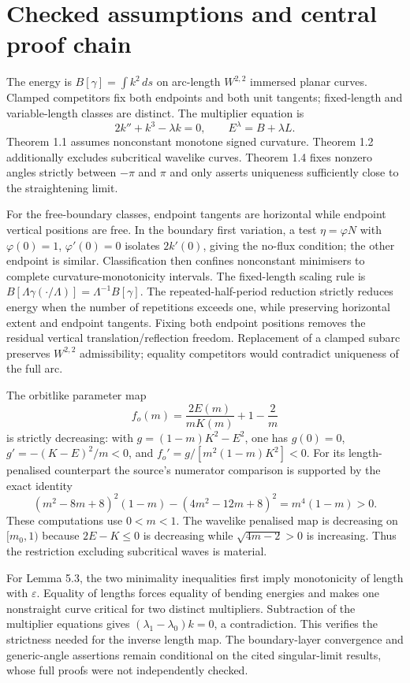 \documentclass[10pt]{article}
\begin{document}
\section*{Checked assumptions and central proof chain}
The energy is \(B[\gamma]=\int k^2\,ds\) on arc-length \(W^{2,2}\) immersed planar curves. Clamped competitors fix both endpoints and both unit tangents; fixed-length and variable-length classes are distinct. The multiplier equation is \[2k''+k^3-\lambda k=0,\qquad E^\lambda=B+\lambda L.\] Theorem 1.1 assumes nonconstant monotone signed curvature. Theorem 1.2 additionally excludes subcritical wavelike curves. Theorem 1.4 fixes nonzero angles strictly between \(-\pi\) and \(\pi\) and only asserts uniqueness sufficiently close to the straightening limit.\par
For the free-boundary classes, endpoint tangents are horizontal while endpoint vertical positions are free. In the boundary first variation, a test \(\eta=\varphi N\) with \(\varphi(0)=1\), \(\varphi'(0)=0\) isolates \(2k'(0)\), giving the no-flux condition; the other endpoint is similar. Classification then confines nonconstant minimisers to complete curvature-monotonicity intervals. The fixed-length scaling rule is \(B[\Lambda\gamma(\cdot/\Lambda)]=\Lambda^{-1}B[\gamma]\). The repeated-half-period reduction strictly reduces energy when the number of repetitions exceeds one, while preserving horizontal extent and endpoint tangents. Fixing both endpoint positions removes the residual vertical translation/reflection freedom. Replacement of a clamped subarc preserves \(W^{2,2}\) admissibility; equality competitors would contradict uniqueness of the full arc.\par
The orbitlike parameter map \[f_o(m)=\frac{2E(m)}{mK(m)}+1-\frac2m\] is strictly decreasing: with \(g=(1-m)K^2-E^2\), one has \(g(0)=0\), \(g'=-(K-E)^2/m<0\), and \(f_o'=g/[m^2(1-m)K^2]<0\). For its length-penalised counterpart the source’s numerator comparison is supported by the exact identity \[(m^2-8m+8)^2(1-m)-(4m^2-12m+8)^2=m^4(1-m)>0.\] These computations use \(0<m<1\). The wavelike penalised map is decreasing on \([m_0,1)\) because \(2E-K\leq0\) is decreasing while \(\sqrt{4m-2}>0\) is increasing. Thus the restriction excluding subcritical waves is material.\par
For Lemma 5.3, the two minimality inequalities first imply monotonicity of length with \(\varepsilon\). Equality of lengths forces equality of bending energies and makes one nonstraight curve critical for two distinct multipliers. Subtraction of the multiplier equations gives \((\lambda_1-\lambda_0)k=0\), a contradiction. This verifies the strictness needed for the inverse length map. The boundary-layer convergence and generic-angle assertions remain conditional on the cited singular-limit results, whose full proofs were not independently checked.\par
\end{document}
